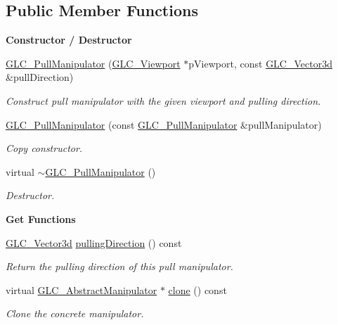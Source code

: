 \subsection*{Public Member Functions}
\begin{Indent}{\bf Constructor / Destructor}\par
\begin{DoxyCompactItemize}
\item 
\hyperlink{class_g_l_c___pull_manipulator_a36b98e2aa3d3f32a7000d50a4ba15915}{G\-L\-C\-\_\-\-Pull\-Manipulator} (\hyperlink{class_g_l_c___viewport}{G\-L\-C\-\_\-\-Viewport} $\ast$p\-Viewport, const \hyperlink{class_g_l_c___vector3d}{G\-L\-C\-\_\-\-Vector3d} \&pull\-Direction)
\begin{DoxyCompactList}\small\item\em Construct pull manipulator with the given viewport and pulling direction. \end{DoxyCompactList}\item 
\hyperlink{class_g_l_c___pull_manipulator_aa9b88f64035c40a2f704596cc130c8e2}{G\-L\-C\-\_\-\-Pull\-Manipulator} (const \hyperlink{class_g_l_c___pull_manipulator}{G\-L\-C\-\_\-\-Pull\-Manipulator} \&pull\-Manipulator)
\begin{DoxyCompactList}\small\item\em Copy constructor. \end{DoxyCompactList}\item 
virtual \hyperlink{class_g_l_c___pull_manipulator_ae6c12362891244497a4966a8632f5c50}{$\sim$\-G\-L\-C\-\_\-\-Pull\-Manipulator} ()
\begin{DoxyCompactList}\small\item\em Destructor. \end{DoxyCompactList}\end{DoxyCompactItemize}
\end{Indent}
\begin{Indent}{\bf Get Functions}\par
\begin{DoxyCompactItemize}
\item 
\hyperlink{class_g_l_c___vector3d}{G\-L\-C\-\_\-\-Vector3d} \hyperlink{class_g_l_c___pull_manipulator_af11fb912703430dd6559dea2deb00f8e}{pulling\-Direction} () const 
\begin{DoxyCompactList}\small\item\em Return the pulling direction of this pull manipulator. \end{DoxyCompactList}\item 
virtual \hyperlink{class_g_l_c___abstract_manipulator}{G\-L\-C\-\_\-\-Abstract\-Manipulator} $\ast$ \hyperlink{class_g_l_c___pull_manipulator_a30f32e5554a058dd0f069ecf8142c28f}{clone} () const 
\begin{DoxyCompactList}\small\item\em Clone the concrete manipulator. \end{DoxyCompactList}\end{DoxyCompactItemize}
\end{Indent}
